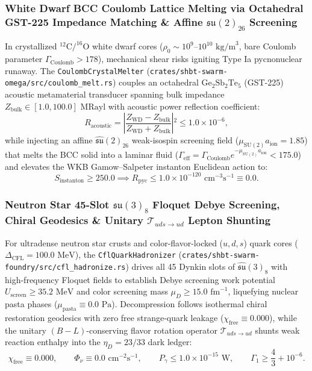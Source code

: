 \documentclass[11pt,onecolumn]{article}
\begin{document}
\subsubsection{White Dwarf BCC Coulomb Lattice Melting via Octahedral GST-225 Impedance Matching \& Affine \texorpdfstring{$\mathfrak{su}(2)_{26}$}{su(2)26} Screening}
In crystallized $^{12}\text{C}/^{16}\text{O}$ white dwarf cores ($\rho_0 \sim 10^9\text{--}10^{10}\text{ kg/m}^3$, bare Coulomb parameter $\Gamma_{\text{Coulomb}} > 178$), mechanical shear risks igniting Type Ia pycnonuclear runaway. The \texttt{CoulombCrystalMelter} (\texttt{crates/shbt-swarm-omega/src/coulomb\_melt.rs}) couples an octahedral $\text{Ge}_2\text{Sb}_2\text{Te}_5$ (GST-225) acoustic metamaterial transducer spanning bulk impedance $Z_{\text{bulk}} \in [1.0, 100.0]\text{ MRayl}$ with acoustic power reflection coefficient:
\begin{equation}
R_{\text{acoustic}} = \left\vert{} \frac{Z_{\text{WD}} - Z_{\text{bulk}}}{Z_{\text{WD}} + Z_{\text{bulk}}} \right\vert{}^2 \le 1.0 \times 10^{-6},
\label{eq:wd_gst225_reflection}
\end{equation}
while injecting an affine $\hat{\mathfrak{su}}(2)_{26}$ weak-isospin screening field ($\mu_{\text{SU}(2)} a_{\text{ion}} = 1.85$) that melts the BCC solid into a laminar fluid ($\Gamma_{\text{eff}} = \Gamma_{\text{Coulomb}} e^{-\mu_{\text{SU}(2)} a_{\text{ion}}} < 175.0$) and elevates the WKB Gamow--Salpeter instanton Euclidean action to:
\begin{equation}
S_{\text{instanton}} \ge 250.0 \implies R_{\text{pyc}} \le 1.0 \times 10^{-120}\text{ cm}^{-3}\text{s}^{-1} \equiv 0.0.
\label{eq:wd_coulomb_melt_gamma}
\end{equation}

\subsubsection{Neutron Star 45-Slot \texorpdfstring{$\mathfrak{su}(3)_8$}{su(3)8} Floquet Debye Screening, Chiral Geodesics \& Unitary \texorpdfstring{$\mathcal{T}_{uds \to ud}$}{T\_uds->ud} Lepton Shunting}
For ultradense neutron star crusts and color-flavor-locked ($u, d, s$) quark cores ($\Delta_{\text{CFL}} = 100.0\text{ MeV}$), the \texttt{CflQuarkHadronizer} (\texttt{crates/shbt-swarm-foundry/src/cfl\_hadronize.rs}) drives all 45 Dynkin slots of $\hat{\mathfrak{su}}(3)_8$ with high-frequency Floquet fields to establish Debye screening work potential $U_{\text{screen}} \ge 35.2\text{ MeV}$ and color screening mass $\mu_D \ge 15.0\text{ fm}^{-1}$, liquefying nuclear pasta phases ($\mu_{\text{pasta}} \equiv 0.0\text{ Pa}$). Decompression follows isothermal chiral restoration geodesics with zero free strange-quark leakage ($\chi_{\text{free}} \equiv 0.000$), while the unitary $(B-L)$-conserving flavor rotation operator $\mathcal{T}_{uds \to ud}$ shunts weak reaction enthalpy into the $\eta_D = 23/33$ dark ledger:
\begin{equation}
\chi_{\text{free}} \equiv 0.000, \qquad \Phi_\nu \equiv 0.0\text{ cm}^{-2}\text{s}^{-1}, \qquad P_\gamma \le 1.0 \times 10^{-15}\text{ W}, \qquad \Gamma_1 \ge \frac{4}{3} + 10^{-6}.
\label{eq:ns_cfl_hadronize_invariants}
\end{equation}
\end{document}
